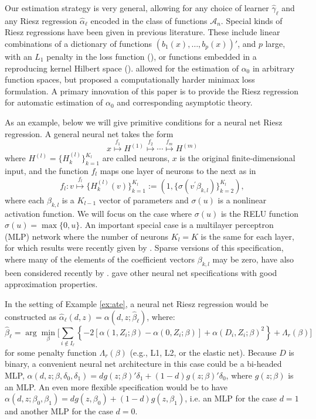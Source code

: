 \documentclass[aos]{imsart}
\numberwithin{equation}{section}
\theoremstyle{plain}
\theoremstyle{remark}
\begin{document}
Our estimation strategy is very general, allowing for any choice of learner $\hat{\gamma}_{\ell}$ and any Riesz regression $\hat{\alpha}_{\ell}$  encoded in the class of functions $\mathcal{A}_n$. 
Special kinds of Riesz regressions have been given in previous literature. 
These include  linear combinations of a dictionary of functions $(b_1(x), \ldots, b_p(x))'$, and $p$ large, with an $L_1$ penalty in the loss function (\cite{chernozhukov2022automatic}), or functions embedded in a reproducing kernel Hilbert space (\cite{singh2021debiased}). \cite{chernozhukov2020adversarial} allowed for the estimation of $\alpha_0$ in arbitrary function spaces, but proposed a computationally harder minimax loss formulation. 
A primary innovation of this paper is to provide the Riesz regression for automatic estimation of $\alpha_0$ and corresponding asymptotic theory. 

As an example, below we will give primitive conditions for a neural net Riesz regression. 
A general neural net takes the form
\[x\overset{f_{1}}{\longmapsto}H^{(1)}\overset{f_{2}}{\longmapsto}\cdots\overset{f_{m}}{\longmapsto}H^{(m)}\]
where $H^{(l)}=\{H_{k}^{(l)}\}_{k=1}^{K_{l}}$ are called neurons, $x$ is the original finite-dimensional input, and the function $f_{l}$ maps one layer of neurons to the next as in%
\[f_{l}:v\overset{f_{l}}{\longmapsto}\{H_{k}^{(l)}(v)\}_{k=1}^{K_{l}%
}:=(1,\{\sigma(v^{\prime}\beta_{k,l})\}_{k=2}^{K_{l}}),\]
where each $\beta_{k,l}$ is a $K_{l-1}$ vector of parameters and $\sigma(u)$ is a nonlinear activation function. We will focus on the case where $\sigma(u)$ is the RELU function $\sigma(u)=\max\{0,u\}$. An important special case is a multilayer perceptron (MLP) network where the number of neurons $K_{l}=K$ is the same for each layer, for which results were recently given by \cite{farrell2021deep}. Sparse versions of this specification, where many of the elements of the coefficient vectors $\beta_{k,l}$ may be zero, have also been considered recently by \cite{schmidt2020nonparametric}. \cite{yarotsky2018optimal} gave other neural net specifications with good approximation properties.

In the setting of Example \ref{ex:ate}, a neural net Riesz regression would be constructed as $\hat\alpha_\ell(d, z) = \alpha(d, z; \hat\beta_\ell)$, where:
\[\hat\beta_\ell = \arg\min_{\beta} 
\bigg[
\sum_{i \notin I_\ell}
\left\lbrace
- 2[\alpha(1, Z_i; \beta) - \alpha(0, Z_i; \beta) ]  +
\alpha(D_i, Z_i; \beta)^2
\right\rbrace
+ \Lambda_r(\beta)
\bigg]
\]
for some penalty function $\Lambda_r(\beta)$ (e.g., L1, L2, or the elastic net). Because $D$ is binary, a convenient neural net architecture in this case could be a bi-headed MLP, $\alpha(d, z; \beta, \delta_0, \delta_1) = d g(z; \beta)'\delta_1 + (1 - d) g(z; \beta)'\delta_0$, where $g(z; \beta)$ is an MLP. An even more flexible specification would be to have $\alpha(d, z; \beta_0, \beta_1) = d g(z, \beta_0) + (1 - d) g(z, \beta_1)$, i.e. an MLP for the case $d = 1$ and another MLP for the case $d = 0$.
\end{document}
